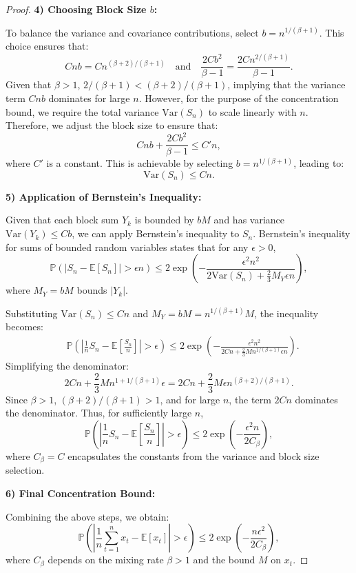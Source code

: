 \begin{proof}
\textbf{4) Choosing Block Size \(b\):}

To balance the variance and covariance contributions, select \(b = n^{1/(\beta + 1)}\). This choice ensures that:
\[
C n b = C n^{(\beta + 2)/(\beta + 1)} \quad \text{and} \quad \frac{2 C b^2}{\beta - 1} = \frac{2 C n^{2/(\beta + 1)}}{\beta - 1}.
\]
Given that \(\beta > 1\), \(2/(\beta + 1) < (\beta + 2)/(\beta + 1)\), implying that the variance term \(C n b\) dominates for large \(n\). However, for the purpose of the concentration bound, we require the total variance \(\text{Var}(S_n)\) to scale linearly with \(n\). Therefore, we adjust the block size to ensure that:
\[
C n b + \frac{2 C b^2}{\beta - 1} \leq C' n,
\]
where \(C'\) is a constant. This is achievable by selecting \(b = n^{1/(\beta + 1)}\), leading to:
\[
\text{Var}(S_n) \leq C n.
\]

\textbf{5) Application of Bernstein's Inequality:}

Given that each block sum \(Y_k\) is bounded by \(bM\) and has variance \(\text{Var}(Y_k) \leq C b\), we can apply Bernstein's inequality to \(S_n\). Bernstein's inequality for sums of bounded random variables states that for any \(\epsilon > 0\),
\[
\mathbb{P}\left(|S_n - \mathbb{E}[S_n]| > \epsilon n\right) \leq 2\exp\left(-\frac{\epsilon^2 n^2}{2 \text{Var}(S_n) + \frac{2}{3} M_Y \epsilon n}\right),
\]
where \(M_Y = bM\) bounds \(|Y_k|\).

Substituting \(\text{Var}(S_n) \leq C n\) and \(M_Y = bM = n^{1/(\beta + 1)} M\), the inequality becomes:
\begin{align*}
&\mathbb{P}\left(\left|\frac{1}{n} S_n - \mathbb{E}\left[\frac{S_n}{n}\right]\right| > \epsilon\right)\leq
2\exp\left(-\frac{\epsilon^2 n^2}{2 C n + \frac{2}{3} M n^{1/(\beta + 1)} \epsilon n}\right).
\end{align*}
Simplifying the denominator:
\[
2 C n + \frac{2}{3} M n^{1 + 1/(\beta + 1)} \epsilon = 2 C n + \frac{2}{3} M \epsilon n^{(\beta + 2)/(\beta + 1)}.
\]
Since \(\beta > 1\), \((\beta + 2)/(\beta + 1) > 1\), and for large \(n\), the term \(2 C n\) dominates the denominator. Thus, for sufficiently large \(n\),
\[
\mathbb{P}\left(\left|\frac{1}{n} S_n - \mathbb{E}\left[\frac{S_n}{n}\right]\right| > \epsilon\right) \leq 2\exp\left(-\frac{\epsilon^2 n}{2 C_\beta}\right),
\]
where \(C_\beta = C\) encapsulates the constants from the variance and block size selection.

\textbf{6) Final Concentration Bound:}

Combining the above steps, we obtain:
\[
\mathbb{P}\left(\left|\frac{1}{n}\sum_{t=1}^n x_t - \mathbb{E}[x_t]\right| > \epsilon\right) \leq 2\exp\left(-\frac{n \epsilon^2}{2 C_\beta}\right),
\]
where \(C_\beta\) depends on the mixing rate \(\beta > 1\) and the bound \(M\) on \(x_t\).


\end{proof}
